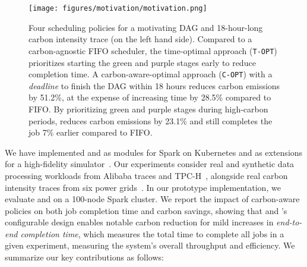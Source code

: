 \begin{figure*}[t]
    \texttt{[image: figures/motivation/motivation.png]}
    \vspace{-1em}
    \caption{ Four scheduling policies for a motivating DAG and 18-hour-long carbon intensity trace (on the left hand side).  
    Compared to a carbon-agnostic FIFO scheduler, the time-optimal approach (\texttt{T-OPT}) prioritizes starting the green and purple stages early to reduce completion time.  A carbon-aware-optimal approach (\texttt{C-OPT}) with a \textit{deadline} to finish the DAG within 18 hours reduces carbon emissions by 51.2\%, at the expense of increasing time by 28.5\% compared to FIFO.  
    By prioritizing green and purple stages during high-carbon periods, \PCAPS reduces carbon emissions by 23.1\% and still completes the job 7\% earlier compared to FIFO.} 
    \label{fig:motivation} \vspace{-1em}
\end{figure*}

We have implemented \PCAPS and \CAP as modules for Spark on Kubernetes and as extensions for a high-fidelity simulator~\cite{Hongzi:2019:Decima}.  Our experiments consider real and synthetic data processing workloads from Alibaba traces and TPC-H~\cite{TPCH:18, Alibaba:18}, alongside real carbon intensity traces from six power grids~\cite{electricity-map}.  
In our prototype implementation, we evaluate \PCAPS and \CAP on a 100-node Spark cluster.
We report the impact of carbon-aware policies on both job completion time and carbon savings, showing that \PCAPS and \CAP's configurable design enables notable carbon reduction for mild increases in \textit{end-to-end completion time}, which measures the total time to complete all jobs in a given experiment, measuring the system's overall throughput and efficiency.
We summarize our key contributions as follows:

